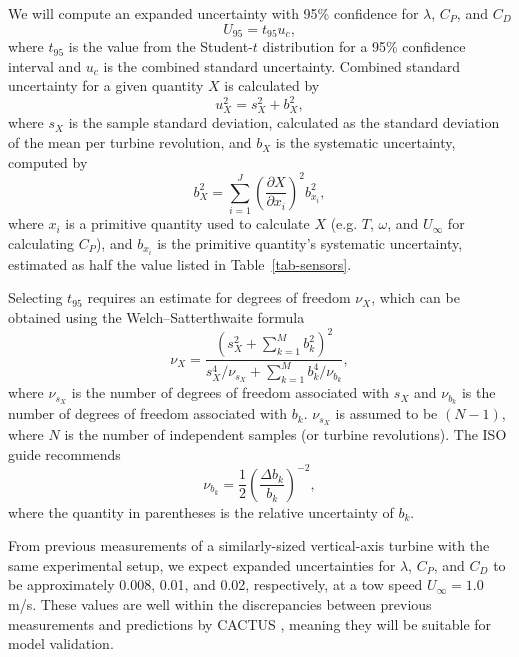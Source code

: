 \documentclass[12pt,letterpaper]{scrreprt}
\begin{document}
We will compute an expanded uncertainty with 95\% confidence for $\lambda$,
$C_P$, and $C_D$
\begin{equation}
U_{95} = t_{95} u_c,
\end{equation}
where $t_{95}$ is the value from the Student-$t$ distribution for a 95\%
confidence interval and $u_c$ is the combined standard uncertainty. Combined
standard uncertainty for a given quantity $X$ is calculated by
\begin{equation}
u_X^2 = s_X^2 + b_X^2,
\end{equation}
where $s_X$ is the sample standard deviation, calculated as the standard
deviation of the mean per turbine revolution, and $b_X$ is the systematic
uncertainty, computed by
\begin{equation}
b_{X}^2 = \sum_{i=1}^J \left( \frac{\partial X}{\partial x_i} \right)^2 b_{x_i}^2,
\end{equation}
where $x_i$ is a primitive quantity used to calculate $X$ (e.g. $T$, $\omega$,
and $U_\infty$ for calculating $C_P$), and $b_{x_i}$ is the primitive quantity's
systematic uncertainty, estimated as half the value listed in
Table~\ref{tab-sensors}.

Selecting $t_{95}$ requires an estimate for degrees of freedom $\nu_X$, which can
be obtained using the Welch--Satterthwaite formula
\begin{equation}
\nu_X = \frac{\left(s_X^2 + \sum_{k=1}^M b_k^2 \right)^2}
             {s_X^4/\nu_{s_X} + \sum_{k=1}^M b_k^4/\nu_{b_k}},
\end{equation}
where $\nu_{s_X}$ is the number of degrees of freedom associated with $s_X$ and
$\nu_{b_k}$ is the number of degrees of freedom associated with $b_k$.
$\nu_{s_X}$ is assumed to be $(N-1)$, where $N$ is the number of independent
samples (or turbine revolutions). The ISO guide recommends
\begin{equation}
\nu_{b_k} = \frac{1}{2} \left( \frac{\Delta b_k}{b_k} \right)^{-2},
\end{equation}
where the quantity in parentheses is the relative uncertainty of $b_k$.

From previous measurements of a similarly-sized vertical-axis turbine with the
same experimental setup, we expect expanded uncertainties for $\lambda$, $C_P$,
and $C_D$ to be approximately 0.008, 0.01, and 0.02, respectively, at a tow
speed $U_\infty = 1.0$ m/s. These values are well within the discrepancies
between previous measurements and predictions by CACTUS \cite{Michelen2014},
meaning they will be suitable for model validation.
\end{document}
